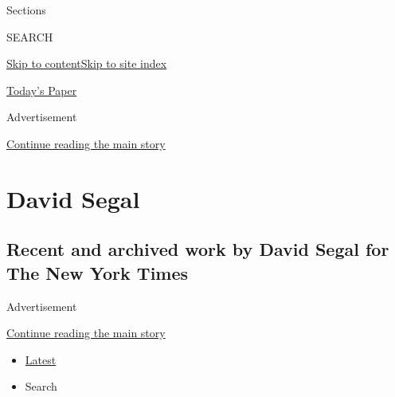 Sections

SEARCH

\protect\hyperlink{site-content}{Skip to
content}\protect\hyperlink{site-index}{Skip to site index}

\href{https://myaccount.nytimes3xbfgragh.onion/auth/login?response_type=cookie\&client_id=vi}{}

\href{https://www.nytimes3xbfgragh.onion/section/todayspaper}{Today's
Paper}

Advertisement

\protect\hyperlink{after-top}{Continue reading the main story}

\hypertarget{david-segal}{%
\section{David Segal}\label{david-segal}}

\hypertarget{recent-and-archived-work-by-david-segal-for-the-new-york-times}{%
\subsection{Recent and archived work by David Segal for The New York
Times}\label{recent-and-archived-work-by-david-segal-for-the-new-york-times}}

Advertisement

\protect\hyperlink{after-mid1}{Continue reading the main story}

\begin{itemize}
\tightlist
\item
  \protect\hyperlink{stream-panel}{Latest}
\item
  Search
\end{itemize}

